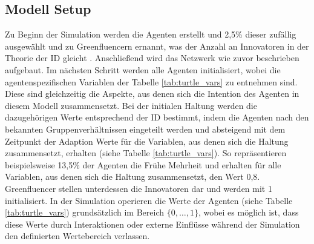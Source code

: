 \documentclass[runningheads]{llncs}
\begin{document}
\subsection{Modell Setup}
Zu Beginn der Simulation werden die Agenten erstellt und 2,5\% dieser zufällig ausgewählt und zu Greenfluencern ernannt, was der Anzahl an Innovatoren in der Theorie der ID gleicht \cite{potthoff_diffusion_2016}. 
Anschließend wird das Netzwerk wie zuvor beschrieben aufgebaut. 
Im nächsten Schritt werden alle Agenten initialisiert, wobei die agentenspezifischen Variablen der Tabelle \ref{tab:turtle_vars} zu entnehmen sind. Diese sind gleichzeitig die Aspekte, aus denen sich die Intention des Agenten in diesem Modell zusammensetzt. Bei der initialen Haltung werden die dazugehörigen Werte entsprechend der ID bestimmt, indem die Agenten nach den bekannten Gruppenverhältnissen eingeteilt werden und absteigend mit dem Zeitpunkt der Adaption Werte für die Variablen, aus denen sich die Haltung zusammensetzt, erhalten (siehe Tabelle \ref{tab:turtle_vars}). So repräsentieren beispielsweise 13,5\% der Agenten die Frühe Mehrheit und erhalten für alle Variablen, aus denen sich die Haltung zusammensetzt, den Wert 0,8. Greenfluencer stellen unterdessen die Innovatoren dar und werden mit 1 initialisiert. %
In der Simulation operieren die Werte der Agenten (siehe Tabelle \ref{tab:turtle_vars}) grundsätzlich im Bereich $\{0, \ldots, 1\}$, wobei es möglich ist, dass diese Werte durch Interaktionen oder externe Einflüsse während der Simulation den definierten Wertebereich verlassen. 
\end{document}
